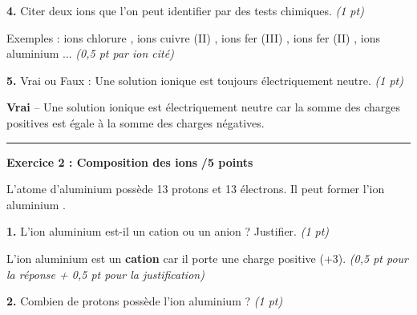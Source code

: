 \documentclass[11pt,a4paper]{article}
\begin{document}
	\vspace{3mm}
	
	\textbf{4.} Citer deux ions que l'on peut identifier par des tests chimiques. \hfill \textit{(1 pt)}
	
	\begin{tcolorbox}[colback=green!5!white,colframe=green!75!black]
		Exemples : ions chlorure , ions cuivre (II) , ions fer (III) , ions fer (II) , ions aluminium ... \textit{(0,5 pt par ion cité)}
	\end{tcolorbox}
	
	\vspace{3mm}
	
	\textbf{5.} Vrai ou Faux : Une solution ionique est toujours électriquement neutre. \hfill \textit{(1 pt)}
	
	\begin{tcolorbox}[colback=green!5!white,colframe=green!75!black]
		\textbf{Vrai} -- Une solution ionique est électriquement neutre car la somme des charges positives est égale à la somme des charges négatives.
	\end{tcolorbox}
	
	\vspace{5mm}
	
	\hrule
	\vspace{3mm}
	
	\textbf{Exercice 2 : Composition des ions} \hfill \textbf{/5 points}
	
	\vspace{3mm}
	
	L'atome d'aluminium possède 13 protons et 13 électrons. Il peut former l'ion aluminium .
	
	\vspace{3mm}
	
	\textbf{1.} L'ion aluminium est-il un cation ou un anion ? Justifier. \hfill \textit{(1 pt)}
	
	\begin{tcolorbox}[colback=green!5!white,colframe=green!75!black]
		L'ion aluminium  est un \textbf{cation} car il porte une charge positive (+3). \textit{(0,5 pt pour la réponse + 0,5 pt pour la justification)}
	\end{tcolorbox}
	
	\vspace{2mm}
	
	\textbf{2.} Combien de protons possède l'ion aluminium  ? \hfill \textit{(1 pt)}
	
\end{document}
